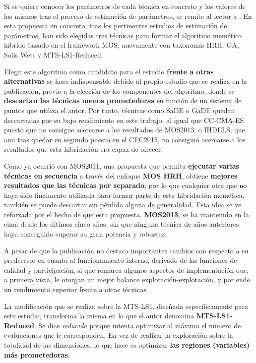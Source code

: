Si se quiere conocer los parámetros de cada técnica en concreto y los valores de los mismos tras el proceso de estimación de parámetros, se remite al lector a \cite{MOS2013}. En esta propuesta en concreto, tras los pertinentes estudios de estimación de parámetros, han sido elegidas tres técnicas para formar el algoritmo memético híbrido basado en el framework MOS, nuevamente con taxonomía HRH\cite{TaxonomyEAs}: GA, Solis Wets y MTS-LS1-Reduced. 

Elegir este algoritmo como candidato para el estudio \textbf{frente a otras alternativas} se hace indispensable debido al propio estudio que se realiza en la publicación, previo a la elección de los componentes del algoritmo, donde se \textbf{descartan las técnicas menos prometedoras} en función de un sistema de puntos que utiliza el autor. Por tanto, técnicas como SaDE o GaDE quedan descartadas por su bajo rendimiento en este trabajo, al igual que CC-CMA-ES puesto que no consigue acercarse a los resultados de MOS2013, o IHDELS, que aun tras quedar en segundo puesto en el CEC2015, no consiguió acercarse a los resultados que esta hibridación era capaz de ofrecer.

Como ya ocurrió con MOS2011, una propuesta que permita \textbf{ejecutar varias técnicas en secuencia} a través del enfoque \textbf{MOS HRH}, obtiene \textbf{mejores resultados que las técnicas por separado}, por lo que cualquier otra que no haya sido finalmente utilizada para formar parte de esta hibridación memética, también se puede descartar sin pérdida alguna de generalidad. Esta idea se ve reforzada por el hecho de que esta propuesta, \textbf{MOS2013}, se ha mantenido en la cima desde los últimos cinco años, sin que ninguna técnica de años anteriores haya conseguido superar su gran potencia y robustez.

A pesar de que la publicación no destaca importantes cambios con respecto a su predecesor en cuanto al funcionamiento interno, derivado de las funciones de calidad y participación, si que remarca algunos aspectos de implementación que, a primera vista, le otorgan un mejor balance exploración-explotación, y por ende un rendimiento superior frente a otras técnicas.

La modificación que se realiza sobre la MTS-LS1, diseñada específicamente para este estudio, transforma la misma en lo que el autor denomina \textbf{MTS-LS1-Reduced}. Se dice \textit{reducida} porque intenta optimizar al máximo el número de evaluaciones que le corresponden. En vez de realizar la exploración sobre la totalidad de las dimensiones, lo que hace es optimizar \textbf{las regiones (variables) más prometedoras}. 

